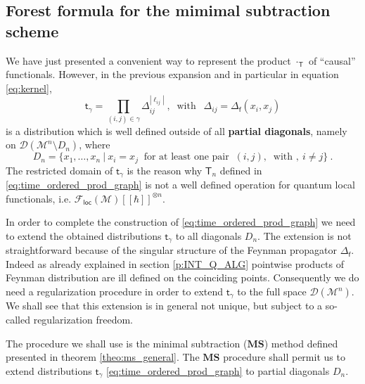 \documentclass[11pt]{book}
\newcommand{\loc}{\mathsf{loc}}
\newcommand{\MS}{\textbf{MS}}
\newcommand{\abs}[1]{\left|#1\right|}
\newcommand{\Dcal}{\mathcal{D}}
\newcommand{\Fcal}{\mathcal{F}}
\newcommand{\Mcal}{\mathcal{M}}
\newcommand{\Tsf}{\mathsf{T}}
\newcommand{\fsf}{\mathsf{f}}
\newcommand{\tsf}{\mathsf{t}}
\theoremstyle{break}
\begin{document}
\subsection{Forest formula for the mimimal subtraction scheme}
\label{p:FOREST FORMULA}


We have just presented a convenient way to represent the product $\cdot_\Tsf$ of ``causal'' functionals. However, in the previous expansion and in particular in equation \eqref{eq:kernel},
%
\begin{equation*}
\tsf_\gamma = \prod_{(i,j)\in\gamma} \Delta_{ij}^{\abs{\ell_{ij}}} \ , \ \mbox{ with } \ \ \Delta_{ij}=\Delta_\fsf(x_i,x_j)
\end{equation*}
%
is a distribution which is well defined outside of all  \textbf{partial diagonals}, namely on $\Dcal(\Mcal^n\setminus D_n)$, where 
%
\begin{equation}
D_n = \left. \bigg\{x_1, \dots , x_n \ \right| \ x_i = x_j \ \text{ for at least one pair } \  (i,j), \ \mbox{ with } , \ i\neq j \bigg\} \ .
\label{eq:partial_diagonals}
\end{equation}
%
The restricted domain of $\tsf_\gamma$ is the reason why $\Tsf_n$ defined in \eqref{eq:time_ordered_prod_graph} is not a well defined operation for quantum local functionals, i.e. $\Fcal_\loc(\Mcal)[[\hbar]]^{\otimes n}$. 


In order to complete the construction of \eqref{eq:time_ordered_prod_graph} we need to extend the obtained distributions $\tsf_\gamma$ to all diagonals $D_n$. The extension is not  straightforward because of the singular structure of the Feynman propagator $\Delta_\fsf$. Indeed as already explained in section \ref{p:INT_Q_ALG} pointwise products of Feynman distribution are ill defined on the coinciding points. Consequently we do need a regularization procedure in order to extend $\tsf_\gamma$ to the full space $\Dcal(\Mcal^n)$. We shall see that this extension is in general not unique, but subject to a so-called regularization freedom.


\bigskip


The procedure we shall use is the minimal subtraction ($\MS$) method defined presented in theorem \ref{theo:ms_general}. The $\MS$ procedure shall permit us to extend distributions $\tsf_\gamma$ \eqref{eq:time_ordered_prod_graph} to partial diagonals $D_n$. 
\end{document}
